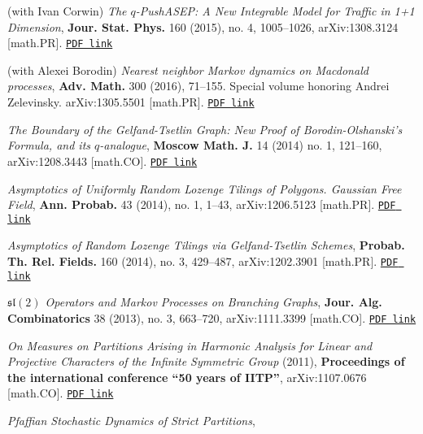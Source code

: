 \documentclass[letterpaper,11pt]{article}
\begin{document}
\begin{etaremune}
	\item
	      (with Ivan Corwin)
	      \emph{The $q$-PushASEP: A New Integrable Model for Traffic in
		      1+1 Dimension},
					\textbf{Jour. Stat. Phys.} 160 (2015), no. 4, 1005--1026,
	      arXiv:1308.3124 [math.PR].
		\href{https://storage.lpetrov.cc/research_files/Petrov-publ/13-publ-petrov.pdf}{\texttt{PDF link}}
	\item
	      (with Alexei Borodin)
	      \emph{Nearest neighbor Markov dynamics on Macdonald processes},
				\textbf{Adv. Math.} 300 (2016), 71--155. Special volume
	      honoring Andrei Zelevinsky. arXiv:1305.5501 [math.PR].
		\href{https://storage.lpetrov.cc/research_files/Petrov-publ/12-publ-petrov.pdf}{\texttt{PDF link}}
	\item
	      \emph{The Boundary of the Gelfand-Tsetlin Graph: New Proof of
		      Borodin-Olshanski's Formula, and its $q$-analogue},
					\textbf{Moscow Math. J.} 14 (2014) no. 1, 121--160,
	      arXiv:1208.3443 [math.CO].
		\href{https://storage.lpetrov.cc/research_files/Petrov-publ/11-publ-petrov.pdf}{\texttt{PDF link}}
	\item
	      \emph{Asymptotics of Uniformly Random Lozenge Tilings of
		      Polygons. Gaussian Free Field},
					\textbf{Ann. Probab.} 43 (2014), no. 1, 1--43, arXiv:1206.5123
	      [math.PR].
		\href{https://storage.lpetrov.cc/research_files/Petrov-publ/10-publ-petrov.pdf}{\texttt{PDF link}}
	\item
	      \emph{Asymptotics of Random Lozenge Tilings via Gelfand-Tsetlin
		      Schemes},
					\textbf{Probab. Th. Rel. Fields.} 160 (2014), no. 3,
	      429--487, arXiv:1202.3901 [math.PR].
		\href{https://storage.lpetrov.cc/research_files/Petrov-publ/09-publ-petrov.pdf}{\texttt{PDF link}}
	\item
	      \emph{$\mathfrak{sl}(2)$
		      Operators and Markov Processes on Branching Graphs},
					\textbf{Jour. Alg. Combinatorics} 38 (2013), no. 3, 663--720,
	      arXiv:1111.3399 [math.CO].
		\href{https://storage.lpetrov.cc/research_files/Petrov-publ/08-publ-petrov.pdf}{\texttt{PDF link}}
	\item
	      \emph{On Measures on Partitions Arising in Harmonic Analysis for
		      Linear and Projective Characters of the Infinite Symmetric Group} (2011),
	      \textbf{Proceedings of the international conference ``50 years of
				IITP''}, arXiv:1107.0676 [math.CO].
		\href{https://storage.lpetrov.cc/research_files/Petrov-publ/07-publ-petrov.pdf}{\texttt{PDF link}}
	\item
	      \emph{Pfaffian Stochastic Dynamics of Strict Partitions},

\end{etaremune}
\end{document}
